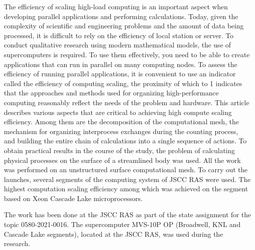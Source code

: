 \documentclass[
11pt,%
tightenlines,%
twoside,%
onecolumn,%
nofloats,%
nobibnotes,%
nofootinbib,%
superscriptaddress,%
noshowpacs,%
centertags]%
{revtex4}
\begin{document}
The efficiency of scaling high-load computing is an important aspect when developing parallel applications and performing calculations.
Today, given the complexity of scientific and engineering problems and the amount of data being processed, it is difficult to rely on the efficiency of local station or server.
To conduct qualitative research using modern mathematical models, the use of supercomputers is required.
To use them effectively, you need to be able to create applications that can run in parallel on many computing nodes.
To assess the efficiency of running parallel applications, it is convenient to use an indicator called the efficiency of computing scaling, the proximity of which to 1 indicates that the approaches and methods used for organizing high-performance computing reasonably reflect the needs of the problem and hardware.
This article describes various aspects that are critical to achieving high compute scaling efficiency.
Among them are the decomposition of the computational mesh, the mechanism for organizing interprocess exchanges during the counting process, and building the entire chain of calculations into a single sequence of actions.
To obtain practical results in the course of the study, the problem of calculating physical processes on the surface of a streamlined body was used.
All the work was performed on an unstructured surface computational mesh.
To carry out the launches, several segments of the computing system of JSCC RAS were used.
The highest computation scaling efficiency among which was achieved on the segment based on Xeon Cascade Lake microprocessors.

\begin{acknowledgments}
The work has been done at the JSCC RAS as part of the state assignment for the topic 0580-2021-0016.
The supercomputer MVS-10P OP (Broadwell, KNL and Cascade Lake segments), located at the JSCC RAS, was used during the research.
\end{acknowledgments}
\end{document}
